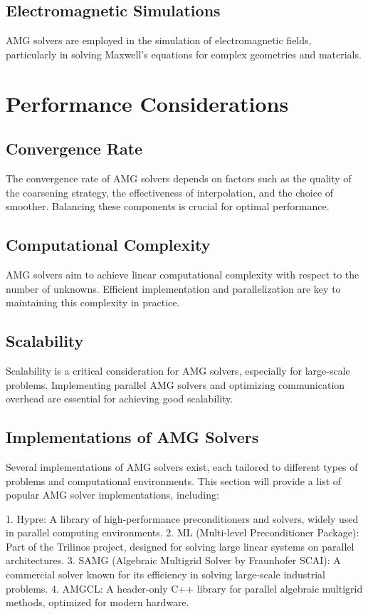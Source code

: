 \subsection{Electromagnetic Simulations}

AMG solvers are employed in the simulation of electromagnetic fields, particularly in solving Maxwell's equations for complex geometries and materials.

\section{Performance Considerations}

\subsection{Convergence Rate}

The convergence rate of AMG solvers depends on factors such as the quality of the coarsening strategy, the effectiveness of interpolation, and the choice of smoother. Balancing these components is crucial for optimal performance.

\subsection{Computational Complexity}

AMG solvers aim to achieve linear computational complexity with respect to the number of unknowns. Efficient implementation and parallelization are key to maintaining this complexity in practice.

\subsection{Scalability}

Scalability is a critical consideration for AMG solvers, especially for large-scale problems. Implementing parallel AMG solvers and optimizing communication overhead are essential for achieving good scalability.

\subsection{Implementations of AMG Solvers}
Several implementations of AMG solvers exist, each tailored to different types of problems and computational environments. This section will provide a list of popular AMG solver implementations, including:

1. Hypre: A library of high-performance preconditioners and solvers, widely used in parallel computing environments.
2. ML (Multi-level Preconditioner Package): Part of the Trilinos project, designed for solving large linear systems on parallel architectures.
3. SAMG (Algebraic Multigrid Solver by Fraunhofer SCAI): A commercial solver known for its efficiency in solving large-scale industrial problems.
4. AMGCL: A header-only C++ library for parallel algebraic multigrid methods, optimized for modern hardware.

